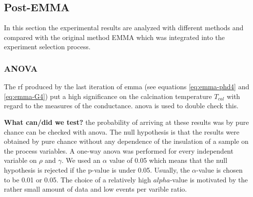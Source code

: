 \subsection{Post-EMMA}
\label{sec:res-post-emma}
In this section the experimental results are analyzed with different methods and compared with the original method EMMA which was integrated into the experiment selection process. 
\subsubsection{ANOVA}\label{sec:res-anova}
The \gls{rf} produced by the last iteration of \gls{emma} (see equations \ref{eq:emma-phd4} and \ref{eq:emma-G4}) put a high significance
on the calcination temperature $T_{cal}$ with regard to the 
measures of the conductance. 
\Gls{anova} is used to double check this. 

\textbf{What can/did we test?}
the probability of arriving at these results was by pure chance can be checked with \gls{anova}. 
The null hypothesis is that the results were obtained by pure chance without any dependence of the insulation of a sample on the process variables.
A one-way \gls{anova} was performed for every independent variable on $\rho$ and $\gamma$. 
We used an $\alpha$ value of 0.05 which means that 
the null hypothesis is rejected if the p-value is under 0.05. 
Usually, the $\alpha$-value is chosen to be 0.01 or 0.05\cite{hoffman2020concept,sellke2001pvalues}.
The choice of a relatively high $alpha$-value is motivated by the rather small amount of data and low events per varible ratio.

